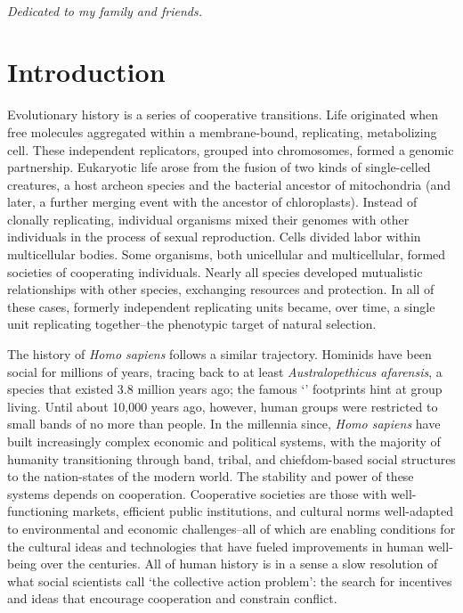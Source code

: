 \documentclass{tufte-book} %
\begin{document}
\cleardoublepage
~\vfill
\begin{doublespace}
\noindent\fontsize{18}{22}\selectfont\itshape
\nohyphenation
Dedicated to my family and friends.
\end{doublespace}
\vfill
\vfill


\cleardoublepage
\chapter{Introduction} 

Evolutionary history is a series of cooperative transitions. Life originated when free molecules aggregated within a membrane-bound, replicating, metabolizing cell. These independent replicators, grouped into chromosomes, formed a genomic partnership. Eukaryotic life arose from the fusion of two kinds of single-celled creatures, a host archeon species and the bacterial ancestor of mitochondria (and later, a further merging event with the ancestor of chloroplasts). Instead of clonally replicating, individual organisms mixed their genomes with other individuals in the process of sexual reproduction. Cells divided labor within multicellular bodies. Some organisms, both unicellular and multicellular, formed societies of cooperating individuals. Nearly all %
species developed mutualistic relationships with other species, exchanging resources and protection. %
In all of these cases, formerly independent replicating units became, over time, a single unit replicating together--the phenotypic target of natural selection. 

The history of \emph{Homo sapiens} follows a similar trajectory. Hominids %
have been social for millions of years, tracing back to at least \emph{Australopethicus afarensis}, a species that existed 3.8 million years ago; the famous `' footprints %
hint at group living. Until about 10,000 years ago, however, human groups were restricted to small bands of no more than %
people. In the millennia since, \emph{Homo sapiens} have built increasingly complex economic and political systems, with the majority of humanity transitioning through band, tribal, and chiefdom-based social structures to the nation-states of the modern world.\cite{service1971primitive} The stability and power of these systems depends on cooperation. Cooperative societies are those with well-functioning markets, efficient public institutions, and cultural norms well-adapted to environmental and economic challenges--all of which are enabling conditions for the cultural ideas and technologies that have fueled improvements in human well-being over the centuries. All of human history is in a sense a slow resolution of what social scientists call `the collective action problem': the search for incentives and ideas that encourage cooperation and constrain conflict.
\end{document}
